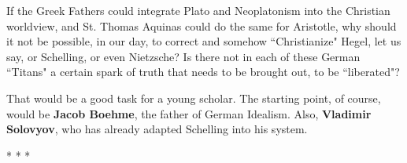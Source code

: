 \begin{quotex}
If the Greek Fathers could integrate Plato and Neoplatonism into the Christian worldview, and St. Thomas Aquinas could do the same for Aristotle, why should it not be possible, in our day, to correct and somehow ``Christianize" Hegel, let us say, or Schelling, or even Nietzsche? Is there not in each of these German ``Titans" a certain spark of truth that needs to be brought out, to be ``liberated"? 

\end{quotex}
That would be a good task for a young scholar. The starting point, of course, would be \textbf{Jacob Boehme}, the father of German Idealism. Also, \textbf{Vladimir Solovyov}, who has already adapted Schelling into his system.




\begin{center}* * *\end{center}


